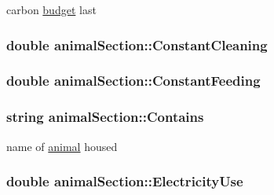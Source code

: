 carbon \hyperlink{classbudget}{budget} last \hypertarget{classanimal_section_a0b615eac60c7a1da2c0ed2ad06e344aa}{
\subsubsection[{ConstantCleaning}]{\setlength{\rightskip}{0pt plus 5cm}double {\bf animalSection::ConstantCleaning}}}
\label{classanimal_section_a0b615eac60c7a1da2c0ed2ad06e344aa}
\hypertarget{classanimal_section_a9c8c6bf7c47686872e99fc5e0978aa40}{
\subsubsection[{ConstantFeeding}]{\setlength{\rightskip}{0pt plus 5cm}double {\bf animalSection::ConstantFeeding}}}
\label{classanimal_section_a9c8c6bf7c47686872e99fc5e0978aa40}
\hypertarget{classanimal_section_a683d78feb642fb9c47b7c6ca04fa06fb}{
\subsubsection[{Contains}]{\setlength{\rightskip}{0pt plus 5cm}string {\bf animalSection::Contains}}}
\label{classanimal_section_a683d78feb642fb9c47b7c6ca04fa06fb}


name of \hyperlink{classanimal}{animal} housed \hypertarget{classanimal_section_a0af16539b92229327a050cce9372f4cc}{
\subsubsection[{ElectricityUse}]{\setlength{\rightskip}{0pt plus 5cm}double {\bf animalSection::ElectricityUse}}}
\label{classanimal_section_a0af16539b92229327a050cce9372f4cc}


